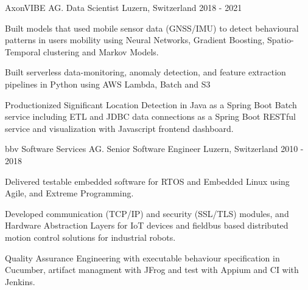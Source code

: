 

\begin{cventries}

  \cventry
    {AxonVIBE AG.} %
    {Data Scientist} %
    {Luzern, Switzerland} %
    {2018 - 2021} %
    {
      \begin{cvitems} %
        \item {
            Built models that used mobile sensor data (GNSS/IMU) to detect 
            behavioural patterns in users mobility using Neural Networks, 
            Gradient Boosting, Spatio-Temporal clustering and Markov Models.}
        \item {
            Built serverless data-monitoring, anomaly detection, 
            and feature extraction pipelines in Python using AWS Lambda, Batch and S3}
        \item {
            Productionized Significant Location Detection in Java as a 
            Spring Boot Batch service including ETL and JDBC data connections as a Spring Boot RESTful service and 
            visualization with Javascript frontend dashboard.}
      \end{cvitems}
    }

\cventry
{bbv Software Services AG.} %
{Senior Software Engineer} %
{Luzern, Switzerland} %
{2010 - 2018} %
{
  \begin{cvitems} %
    \item {
        Delivered testable embedded software for RTOS and Embedded Linux using Agile, 
        and Extreme Programming.}
    \item {
        Developed communication (TCP/IP) and security (SSL/TLS) modules,
        and Hardware Abstraction Layers for IoT devices and fieldbus based 
        distributed motion control solutions for industrial robots.}
    \item {
        Quality Assurance Engineering with executable behaviour specification in Cucumber, 
        artifact managment with JFrog and test with Appium and CI with Jenkins. 
        }
  \end{cvitems}
}


\end{cventries}
